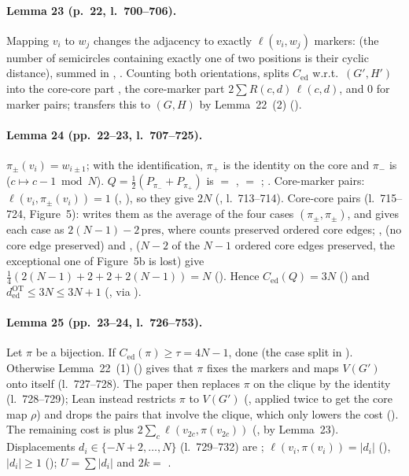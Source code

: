 \paragraph{Lemma 23 (p.~22, l.~700--706).} Mapping $v_i$ to $w_j$ changes the adjacency to exactly
$\ell(v_i,w_j)$ markers:  (the number of semicircles containing exactly one of two
positions is their cyclic distance), summed in , . Counting both
orientations,  splits $C_{\mathrm{ed}}$ w.r.t.\ $(G',H')$ into the core-core part
, the core-marker part $2\sum R(c,d)\,\ell(c,d)$, and $0$ for marker pairs;
 transfers this to $(G,H)$ by Lemma~22~(2) ().

\paragraph{Lemma 24 (pp.~22--23, l.~707--725).} $\pi_\pm(v_i)=w_{i\pm1}$; with the identification, $\pi_+$ is the
identity on the core and $\pi_-$ is  ($c\mapsto c-1\bmod N$). $Q=\frac12(P_{\pi_-}+P_{\pi_+})$ is
 $=$ ,  $=$ ; .
Core-marker pairs: $\ell(v_i,\pi_\pm(v_i))=1$ (, ), so they give $2N$
(, l.~713--714). Core-core pairs (l.~715--724, Figure~5):  writes
them as the average of the four cases $(\pi_\pm,\pi_\pm)$, and  gives each case as
$2(N-1)-2\,\mathrm{pres}$, where  counts preserved ordered core edges; ,
 (no core edge preserved) and ,  ($N-2$ of the
$N-1$ ordered core edges preserved, the exceptional one of Figure~5b is lost) give $\frac14(2(N-1)+2+2+2(N-1))=N$ (). Hence
$C_{\mathrm{ed}}(Q)=3N$ () and $d^{\mathrm{OT}}_{\mathrm{ed}}\le3N\le3N+1$ (,
via ).

\paragraph{Lemma 25 (pp.~23--24, l.~726--753).} Let $\pi$ be a bijection. If $C_{\mathrm{ed}}(\pi)\ge\tau=4N-1$, done
(the case split in ). Otherwise Lemma~22~(1) () gives that $\pi$
fixes the markers and maps $V(G')$ onto itself (l.~727--728). The paper then replaces $\pi$ on the clique by
the identity (l.~728--729); Lean instead restricts $\pi$ to $V(G')$ (, applied twice to get
the core map $\rho$) and drops the pairs that involve the clique, which only lowers the cost
(). The remaining cost is  plus
$2\sum_c\ell(v_{2c},\pi(v_{2c}))$ (, by Lemma~23). Displacements
$d_i\in\{-N+2,\dots,N\}$ (l.~729--732) are ; $\ell(v_i,\pi(v_i))=|d_i|$ (),
$|d_i|\ge1$ (); $U=\sum|d_i|$ and $2k=$ .

